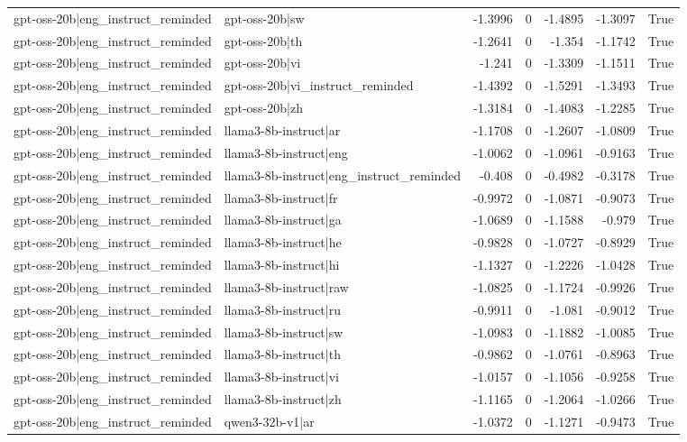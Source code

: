 \begin{table}
\begin{tabular}{l l r r r r l}
gpt-oss-20b|eng_instruct_reminded & gpt-oss-20b|sw & -1.3996 & 0 & -1.4895 & -1.3097 & True \\
gpt-oss-20b|eng_instruct_reminded & gpt-oss-20b|th & -1.2641 & 0 & -1.354 & -1.1742 & True \\
gpt-oss-20b|eng_instruct_reminded & gpt-oss-20b|vi & -1.241 & 0 & -1.3309 & -1.1511 & True \\
gpt-oss-20b|eng_instruct_reminded & gpt-oss-20b|vi_instruct_reminded & -1.4392 & 0 & -1.5291 & -1.3493 & True \\
gpt-oss-20b|eng_instruct_reminded & gpt-oss-20b|zh & -1.3184 & 0 & -1.4083 & -1.2285 & True \\
gpt-oss-20b|eng_instruct_reminded & llama3-8b-instruct|ar & -1.1708 & 0 & -1.2607 & -1.0809 & True \\
gpt-oss-20b|eng_instruct_reminded & llama3-8b-instruct|eng & -1.0062 & 0 & -1.0961 & -0.9163 & True \\
gpt-oss-20b|eng_instruct_reminded & llama3-8b-instruct|eng_instruct_reminded & -0.408 & 0 & -0.4982 & -0.3178 & True \\
gpt-oss-20b|eng_instruct_reminded & llama3-8b-instruct|fr & -0.9972 & 0 & -1.0871 & -0.9073 & True \\
gpt-oss-20b|eng_instruct_reminded & llama3-8b-instruct|ga & -1.0689 & 0 & -1.1588 & -0.979 & True \\
gpt-oss-20b|eng_instruct_reminded & llama3-8b-instruct|he & -0.9828 & 0 & -1.0727 & -0.8929 & True \\
gpt-oss-20b|eng_instruct_reminded & llama3-8b-instruct|hi & -1.1327 & 0 & -1.2226 & -1.0428 & True \\
gpt-oss-20b|eng_instruct_reminded & llama3-8b-instruct|raw & -1.0825 & 0 & -1.1724 & -0.9926 & True \\
gpt-oss-20b|eng_instruct_reminded & llama3-8b-instruct|ru & -0.9911 & 0 & -1.081 & -0.9012 & True \\
gpt-oss-20b|eng_instruct_reminded & llama3-8b-instruct|sw & -1.0983 & 0 & -1.1882 & -1.0085 & True \\
gpt-oss-20b|eng_instruct_reminded & llama3-8b-instruct|th & -0.9862 & 0 & -1.0761 & -0.8963 & True \\
gpt-oss-20b|eng_instruct_reminded & llama3-8b-instruct|vi & -1.0157 & 0 & -1.1056 & -0.9258 & True \\
gpt-oss-20b|eng_instruct_reminded & llama3-8b-instruct|zh & -1.1165 & 0 & -1.2064 & -1.0266 & True \\
gpt-oss-20b|eng_instruct_reminded & qwen3-32b-v1|ar & -1.0372 & 0 & -1.1271 & -0.9473 & True \\

\end{tabular}
\end{table}
